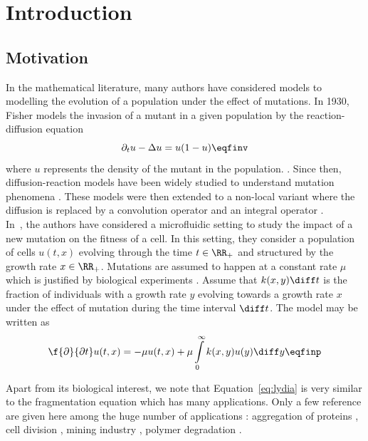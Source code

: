 \section{Introduction}

\subsection{Motivation}
In the mathematical literature, many authors have considered models to modelling the evolution of a population under the effect of mutations. In 1930, Fisher models the invasion of a mutant in a given population by the reaction-diffusion equation
    \begin{equation*}
        \partial_t u - \Delta u = u(1-u)
        \eqfinv
    \end{equation*} 
where $u$ represents the density of the mutant in the population. . 
Since then, diffusion-reaction models have been widely studied to understand mutation phenomena \cite{alfaro2017replicator,alfaro2017superexponential}. 
These models were then extended to a non-local variant where the diffusion is replaced by a convolution operator \cite{coville2007non} and an integral operator \cite{burger1996stationary,bonnefon2015concentration}. \\

In~\cite{robert2018mutation}, the authors have considered a microfluidic setting to study the impact of a new mutation on the fitness of a cell. 
In this setting, they consider a population of cells $u(t,x)$ evolving through the time $t \in \RR_+$ and structured by the growth rate $x \in \RR_+$. Mutations are assumed to happen at a constant rate $\mu$ which is justified by biological experiments \cite{robert2018mutation}.  Assume that $k(x,y)\diff t$ is the fraction of individuals with a growth rate $y$ evolving towards a growth rate $x$ under the effect of mutation during the time interval $\diff t$. The model may be written as 
    \begin{equation}
    \f{\partial}{\partial t} u(t,x) = - \mu u(t,x) + \mu \int\limits_0^\infty k(x,y) u(y) \diff y 
    \eqfinp
    \label{eq:lydia}
    \end{equation}

Apart from its biological interest, we note that Equation~\eqref{eq:lydia} is very similar to the fragmentation equation which has many applications. Only a few reference are given here among the huge number of applications : aggregation of proteins \cite{xue2013imaging}, cell division \cite{doumic2013estimating}, mining industry \cite{kolmogorov1941logarithmic, bertoin2005fragmentation}, polymer degradation \cite{montroll1940theory,ziff1985kinetics}. \\

